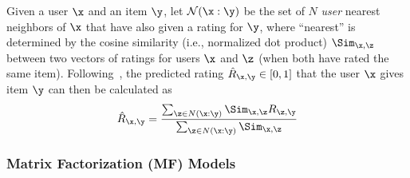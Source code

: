 Given a user $\x$ and an item $\y$, 
let ${\mathcal N}(\x:\y)$ be the set of $N$ 
\emph{user} nearest neighbors of $\x$ that have also given a rating
for $\y$, where ``nearest'' is determined by the cosine similarity (i.e.,
normalized dot product) $\Sim_{\x,\z}$ between two vectors of ratings
for users $\x$ and $\z$ (when both have rated the same item).
Following~\cite{bellkor},
the predicted rating $\hat{R}_{\x,\y} \in [0,1]$ that the user $\x$
gives item $\y$ can then be calculated as
\begin{equation}
\hat{R}_{\x,\y} = \frac{\sum_{\z \in N(\x:\y)} {\Sim_{\x,\z} R_{\z,\y}} } {\sum_{\z \in N(\x:\y)}{\Sim_{\x,\z}}}\end{equation}


\subsubsection{Matrix Factorization (MF) Models}
\label{sec:mf}

